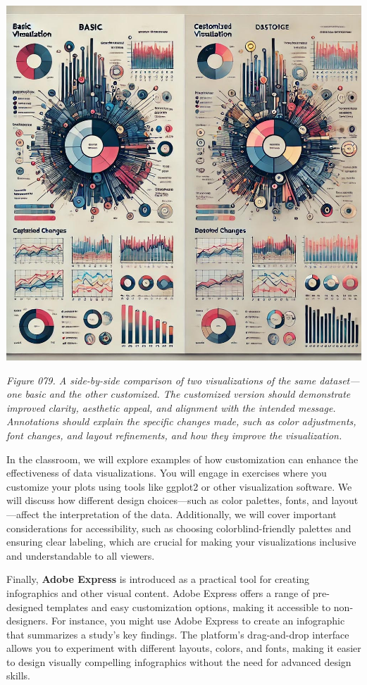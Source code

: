 \documentclass[
]{book}
\begin{document}
\includegraphics[width=1\textwidth,height=\textheight]{images/fig079.jpg}

\emph{Figure 079. A side-by-side comparison of two visualizations of the same dataset---one basic and the other customized. The customized version should demonstrate improved clarity, aesthetic appeal, and alignment with the intended message. Annotations should explain the specific changes made, such as color adjustments, font changes, and layout refinements, and how they improve the visualization.}

In the classroom, we will explore examples of how customization can enhance the effectiveness of data visualizations. You will engage in exercises where you customize your plots using tools like ggplot2 or other visualization software. We will discuss how different design choices---such as color palettes, fonts, and layout---affect the interpretation of the data. Additionally, we will cover important considerations for accessibility, such as choosing colorblind-friendly palettes and ensuring clear labeling, which are crucial for making your visualizations inclusive and understandable to all viewers.

Finally, \textbf{Adobe Express} is introduced as a practical tool for creating infographics and other visual content. Adobe Express offers a range of pre-designed templates and easy customization options, making it accessible to non-designers. For instance, you might use Adobe Express to create an infographic that summarizes a study's key findings. The platform's drag-and-drop interface allows you to experiment with different layouts, colors, and fonts, making it easier to design visually compelling infographics without the need for advanced design skills.
\end{document}
